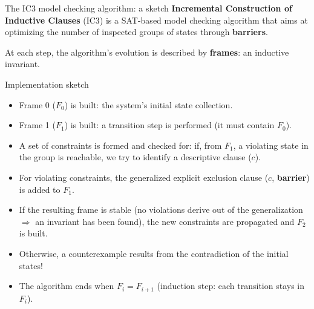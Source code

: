 \documentclass[aspectratio=1610,10.5pt]{beamer} %
\begin{document}
\begin{frame}{The IC3 model checking algorithm: a sketch}
    \textbf{Incremental Construction of Inductive Clauses} (IC3) is a SAT-based model checking algorithm that aims at optimizing the number of inspected groups of states through \textbf{barriers}.

    \medskip

    At each step, the algorithm's evolution is described by \textbf{frames}: an inductive invariant.

    \begin{block}{Implementation sketch}
        \begin{itemize}
            \item Frame 0 ($F_0$) is built: the system's initial state collection.
            \item Frame 1 ($F_1$) is built: a transition step is performed (it must contain $F_0$).
            \item A set of constraints is formed and checked for: if, from $F_1$, a violating state in the group is reachable, we try to identify a descriptive clause ($c$).
            \item For violating constraints, the generalized explicit exclusion clause ($c$, \textbf{barrier}) is added to $F_1$.
            \item If the resulting frame is stable (no violations derive out of the generalization $\Rightarrow$ an invariant has been found), the new constraints are propagated and $F_2$ is built.
            \item Otherwise, a counterexample results from the contradiction of the initial states!
            \item The algorithm ends when
                $F_i = F_{i+1}$ (induction step: each transition stays in $F_i$).
        \end{itemize}
    \end{block}

\end{frame}
\end{document}
